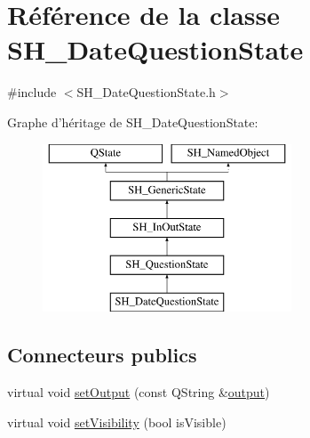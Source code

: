 \hypertarget{classSH__DateQuestionState}{\section{Référence de la classe S\-H\-\_\-\-Date\-Question\-State}
\label{classSH__DateQuestionState}
}


{\ttfamily \#include $<$S\-H\-\_\-\-Date\-Question\-State.\-h$>$}

Graphe d'héritage de S\-H\-\_\-\-Date\-Question\-State\-:\begin{figure}[H]
\begin{center}
\leavevmode
\includegraphics[height=5.000000cm]{classSH__DateQuestionState}
\end{center}
\end{figure}
\subsection*{Connecteurs publics}
\begin{DoxyCompactItemize}
\item 
virtual void \hyperlink{classSH__InOutState_af611c84134e262739cd834797b315c80}{set\-Output} (const Q\-String \&\hyperlink{classSH__InOutState_a17ed7eaf5e3ed5af80a4f9fe65d5bfd9}{output})
\item 
virtual void \hyperlink{classSH__InOutState_a7fdfaa6f600f0ac4a96f238a038ba9ad}{set\-Visibility} (bool is\-Visible)
\end{DoxyCompactItemize}
